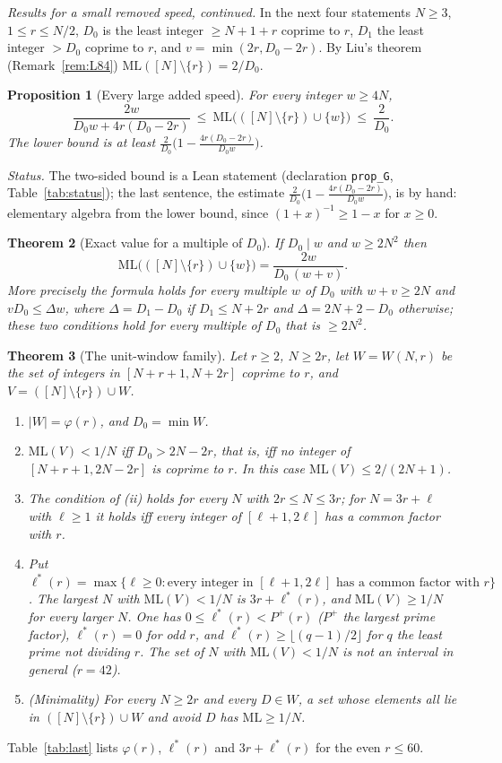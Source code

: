 \documentclass[11pt]{article}
\newtheorem{theorem}{Theorem}[section]
\newtheorem{proposition}[theorem]{Proposition}
\theoremstyle{definition}
\theoremstyle{remark}
\newcommand{\ML}{\mathrm{ML}}
\begin{document}
\medskip\noindent\emph{Results for a small removed speed, continued.} In the next four statements $N\ge3$, $1\le r\le N/2$, $D_0$ is the least integer $\ge N+1+r$ coprime to $r$, $D_1$ the least integer $>D_0$ coprime to $r$, and $v=\min(2r,D_0-2r)$. By Liu's theorem (Remark~\ref{rem:L84}) $\ML([N]\setminus\{r\})=2/D_0$.

\begin{proposition}[Every large added speed]\label{prop:allw}
For every integer $w\ge4N$,
\[
\frac{2w}{D_0w+4r(D_0-2r)}\ \le\ \ML\bigl(([N]\setminus\{r\})\cup\{w\}\bigr)\ \le\ \frac2{D_0}.
\]
The lower bound is at least $\frac2{D_0}\bigl(1-\frac{4r(D_0-2r)}{D_0w}\bigr)$.
\end{proposition}
\emph{Status.} The two-sided bound is a Lean statement (declaration \texttt{prop\_G}, Table~\ref{tab:status}); the last sentence, the estimate $\frac2{D_0}\bigl(1-\frac{4r(D_0-2r)}{D_0w}\bigr)$, is by hand: elementary algebra from the lower bound, since $(1+x)^{-1}\ge1-x$ for $x\ge0$.

\begin{theorem}[Exact value for a multiple of $D_0$]\label{thm:exact}
If $D_0\mid w$ and $w\ge2N^2$ then
\[
\ML\bigl(([N]\setminus\{r\})\cup\{w\}\bigr)=\frac{2w}{D_0\,(w+v)}.
\]
More precisely the formula holds for every multiple $w$ of $D_0$ with $w+v\ge2N$ and $vD_0\le\Delta w$, where $\Delta=D_1-D_0$ if $D_1\le N+2r$ and $\Delta=2N+2-D_0$ otherwise; these two conditions hold for every multiple of $D_0$ that is $\ge2N^2$.
\end{theorem}

\begin{theorem}[The unit-window family]\label{thm:win}
Let $r\ge2$, $N\ge2r$, let $W=W(N,r)$ be the set of integers in $[N+r+1,N+2r]$ coprime to $r$, and $V=([N]\setminus\{r\})\cup W$.
\begin{enumerate}[label=(\roman*),nosep]
\item $|W|=\varphi(r)$, and $D_0=\min W$.
\item $\ML(V)<1/N$ iff $D_0>2N-2r$, that is, iff no integer of $[N+r+1,2N-2r]$ is coprime to $r$. In this case $\ML(V)\le2/(2N+1)$.
\item The condition of (ii) holds for every $N$ with $2r\le N\le3r$; for $N=3r+\ell$ with $\ell\ge1$ it holds iff every integer of $[\ell+1,2\ell]$ has a common factor with $r$.
\item Put $\ell^*(r)=\max\{\ell\ge0:\text{every integer in }[\ell+1,2\ell]\text{ has a common factor with }r\}$. The largest $N$ with $\ML(V)<1/N$ is $3r+\ell^*(r)$, and $\ML(V)\ge1/N$ for every larger $N$. One has $0\le\ell^*(r)<P^+(r)$ ($P^+$ the largest prime factor), $\ell^*(r)=0$ for odd $r$, and $\ell^*(r)\ge\lfloor(q-1)/2\rfloor$ for $q$ the least prime not dividing $r$. The set of $N$ with $\ML(V)<1/N$ is not an interval in general ($r=42$).
\item (Minimality) For every $N\ge2r$ and every $D\in W$, a set whose elements all lie in $([N]\setminus\{r\})\cup W$ and avoid $D$ has $\ML\ge1/N$.
\end{enumerate}
\end{theorem}
Table~\ref{tab:last} lists $\varphi(r)$, $\ell^*(r)$ and $3r+\ell^*(r)$ for the even $r\le60$.
\end{document}
